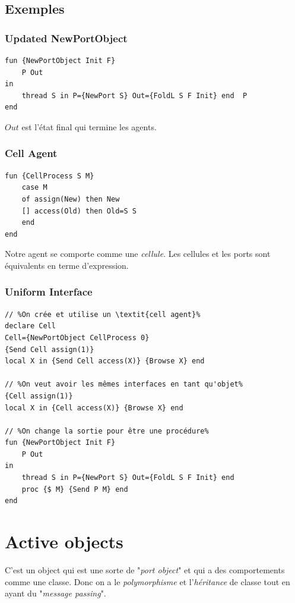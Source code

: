 \documentclass{report}
\begin{document}
\subsection{Exemples}
\subsubsection{Updated NewPortObject}
\begin{lstlisting}[escapechar=\%]
fun {NewPortObject Init F} 
	P Out
in
	thread S in P={NewPort S} Out={FoldL S F Init} end 	P
end
\end{lstlisting}
$Out$ est l'état final qui termine les agents.

\subsubsection{Cell Agent}
\begin{lstlisting}[escapechar=\%]
fun {CellProcess S M} 
	case M 
	of assign(New) then New 
	[] access(Old) then Old=S S 
	end
end
\end{lstlisting}
Notre agent se comporte comme une \textit{cellule}. Les cellules et les ports sont équivalents en terme d'expression.

\subsubsection{Uniform Interface}
\begin{lstlisting}[escapechar=\%]
// %On crée et utilise un \textit{cell agent}%
declare Cell 
Cell={NewPortObject CellProcess 0} 
{Send Cell assign(1)}
local X in {Send Cell access(X)} {Browse X} end

// %On veut avoir les mêmes interfaces en tant qu'objet%
{Cell assign(1)} 
local X in {Cell access(X)} {Browse X} end

// %On change la sortie pour être une procédure%
fun {NewPortObject Init F} 
	P Out
in
	thread S in P={NewPort S} Out={FoldL S F Init} end 
	proc {$ M} {Send P M} end
end
\end{lstlisting}

\section{Active objects}
C'est un object qui est une sorte de "\textit{port object}" et qui a des comportements comme une classe. Donc on a le \textit{polymorphisme} et l'\textit{héritance} de classe tout en ayant du "\textit{message passing}".
\end{document}
